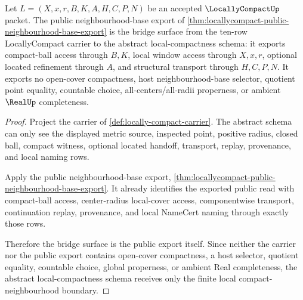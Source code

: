 \begin{theorem}
\label{thm:locallycompact-abstract-schema-bridge-surface}
Let $L=(X,x,r,B,K,A,H,C,P,N)$ be an accepted $\LocallyCompactUp$ packet. The public neighbourhood-base export of \autoref{thm:locallycompact-public-neighbourhood-base-export} is the bridge surface from the ten-row LocallyCompact carrier to the abstract local-compactness schema: it exports compact-ball access through $B,K$, local window access through $X,x,r$, optional located refinement through $A$, and structural transport through $H,C,P,N$. It exports no open-cover compactness, host neighbourhood-base selector, quotient point equality, countable choice, all-centers/all-radii properness, or ambient $\RealUp$ completeness.
\end{theorem}
\begin{proof}
Project the carrier of \autoref{def:locally-compact-carrier}. The abstract schema can only see the displayed metric source, inspected point, positive radius, closed ball, compact witness, optional located handoff, transport, replay, provenance, and local naming rows.

Apply the public neighbourhood-base export, \autoref{thm:locallycompact-public-neighbourhood-base-export}. It already identifies the exported public read with compact-ball access, center-radius local-cover access, componentwise transport, continuation replay, provenance, and local NameCert naming through exactly those rows.

Therefore the bridge surface is the public export itself. Since neither the carrier nor the public export contains open-cover compactness, a host selector, quotient equality, countable choice, global properness, or ambient Real completeness, the abstract local-compactness schema receives only the finite local compact-neighbourhood boundary.
\end{proof}

